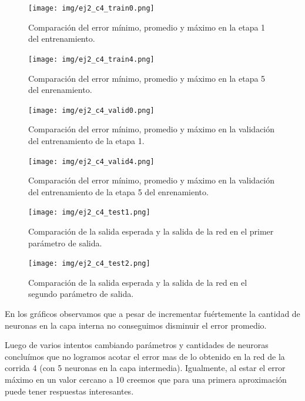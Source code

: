 \documentclass[onecolumn,10pt]{article}
\begin{document}
\begin{figure}[H]
  \centering
  \texttt{[image: img/ej2\_c4\_train0.png]}
  \caption{Comparación del error mínimo, promedio y máximo en la etapa 1 del entrenamiento.}
  \label{fig:ej2_c4_train0}
\end{figure}

\begin{figure}[H]
  \centering
  \texttt{[image: img/ej2\_c4\_train4.png]}
  \caption{Comparación del error mínimo, promedio y máximo en la etapa 5 del enrenamiento.}
  \label{fig:ej2_c4_train4}
\end{figure}

\begin{figure}[H]
  \centering
  \texttt{[image: img/ej2\_c4\_valid0.png]}
  \caption{Comparación del error mínimo, promedio y máximo en la validación del entrenamiento de la etapa 1.}
  \label{fig:ej2_c4_valid0}
\end{figure}

\begin{figure}[H]
  \centering
  \texttt{[image: img/ej2\_c4\_valid4.png]}
  \caption{Comparación del error mínimo, promedio y máximo en la validación del entrenamiento de la etapa 5 del enrenamiento.}
  \label{fig:ej2_c4_valid4}
\end{figure}

\begin{figure}[H]
  \centering
  \texttt{[image: img/ej2\_c4\_test1.png]}
  \caption{Comparación de la salida esperada y la salida de la red en el primer parámetro de salida.}
  \label{fig:ej2_c4_test1}
\end{figure}

\begin{figure}[H]
  \centering
  \texttt{[image: img/ej2\_c4\_test2.png]}
  \caption{Comparación de la salida esperada y la salida de la red en el segundo parámetro de salida.}
  \label{fig:ej2_c4_test2}
\end{figure}


En los gráficos observamos que a pesar de incrementar fuértemente la cantidad de neuronas en la capa interna no conseguimos disminuir el error promedio.


Luego de varios intentos cambiando parámetros y cantidades de neuroras concluímos que no logramos acotar el error mas de lo obtenido en la red de la corrida 4 (con 5 neuronas en la capa intermedia). Igualmente, al estar el error máximo en un valor cercano a 10 creemos que para una primera aproximación puede tener respuestas interesantes.
\end{document}
